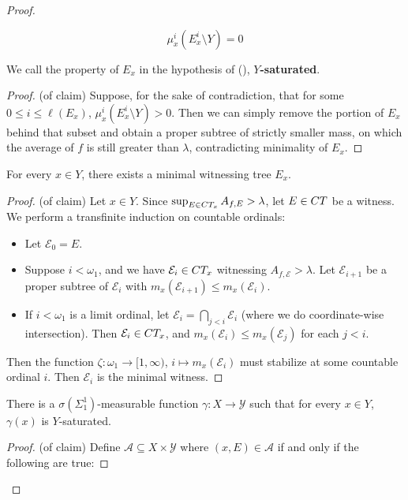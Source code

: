 \documentclass[10pt,a4paper]{amsart}
\newcommand{\CT}{\textmd{CT}}
\renewcommand{\ref}[1]{(\oldref{#1})}
\begin{document}
\begin{proof}
\begin{claim}
        \[
        \mu_x^i(E_x^i\setminus Y) = 0
        \]
    \end{claim}
    \noindent We call the property of $ E_x $ in the hypothesis of \ref{minimal gives right thing}, \textbf{$Y$-saturated}. 
    \begin{proof}
        (of claim) Suppose, for the sake of contradiction, that for some $ 0\leq i \leq \ell(E_x) $, $ \mu^i_x(E_x^i\setminus Y) > 0 $. Then we can simply remove the portion of $ E_x $ behind that subset and obtain a proper subtree of strictly smaller mass, on which the average of $ f $ is still greater than $ \lambda $, contradicting minimality of $ E_x $.
    \end{proof}
    \begin{claim}
        For every $ x\in Y $, there exists a minimal witnessing tree $ E_x $.
    \end{claim}
    \begin{proof}
        (of claim) Let $ x\in Y $. Since $ \sup_{E\in \CT_x} A_{f,E} > \lambda $, let $ E\in \CT  $ be a witness. We perform a transfinite induction on countable ordinals:
        \begin{itemize}
            \item Let $ \mathcal{E}_0 = E $.
            \item Suppose $ i<\omega_1 $, and we have $\mathcal{E}_i \in \CT_x $ witnessing $ A_{f,\mathcal{E}} >\lambda $. Let $ \mathcal{E}_{i+1} $ be a proper subtree of $ \mathcal{E}_i $ with $ m_x(\mathcal{E}_{i+1})\leq m_x(\mathcal{E}_i) $. 
            \item If $ i<\omega_1 $ is a limit ordinal, let $ \mathcal{E}_i = \bigcap_{j<i}\mathcal{E}_i $ (where we do coordinate-wise intersection). Then $ \mathcal{E}_i \in \CT_x $, and $ m_x(\mathcal{E}_i)\leq m_x(\mathcal{E}_j) $ for each $ j<i $.
        \end{itemize}
        Then the function $ \zeta:\omega_1\to [1,\infty) $, $ i\mapsto m_x(\mathcal{E}_i) $ must stabilize at some countable ordinal $ i $. Then $ \mathcal{E}_i $ is the minimal witness.
    \end{proof}
    \begin{claim}\label{maximaluniformization}
        There is a $ \sigma(\Sigma^1_1) $-measurable function $ \gamma:X\to \mathcal{Y} $ such that for every $ x\in Y $, $ \gamma(x) $ is $ Y $-saturated. 
    \end{claim}
    \begin{proof}
        (of claim) Define $ \mathcal{A}\subseteq X\times \mathcal{Y} $ where $ (x,E)\in \mathcal{A} $ if and only if the following are true:

\end{proof}
\end{proof}
\end{document}
